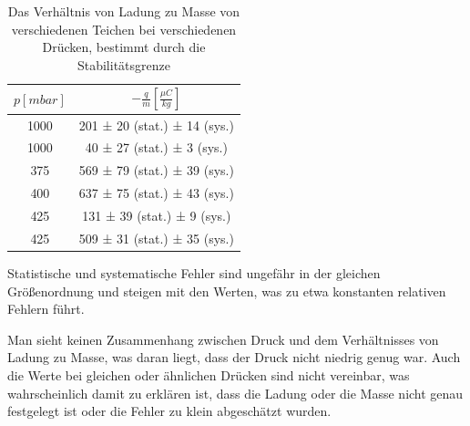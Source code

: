 \documentclass[a4paper,12pt]{article}
\begin{document}
\begin{table}[h]
	\centering
	\begin{tabular}{ c| c }
		$p [\unit{mbar}]$ & $-\frac{q}{m}[\frac{\mu C}{kg}]$ \\
		\hline
		1000 & 201 ± 20 (stat.) ± 14 (sys.)\\
		1000 & 40 ± 27 (stat.) ± 3 (sys.)\\
		375 & 569 ± 79 (stat.) ± 39 (sys.)\\
		400 & 637 ± 75 (stat.) ± 43 (sys.)\\
		425 & 131 ± 39 (stat.) ± 9 (sys.)\\
		425 & 509 ± 31 (stat.) ± 35 (sys.)
	\end{tabular}
\caption{Das Verhältnis von Ladung zu Masse von verschiedenen Teichen bei verschiedenen Drücken, bestimmt durch die Stabilitätsgrenze}
\label{tab:stabil-result}
\end{table}
Statistische und systematische Fehler sind ungefähr in der gleichen Größenordnung und steigen mit den Werten, was zu etwa konstanten relativen Fehlern führt.

Man sieht keinen Zusammenhang zwischen Druck und dem Verhältnisses von Ladung zu Masse, was daran liegt, dass der Druck nicht niedrig genug war.
Auch die Werte bei gleichen oder ähnlichen Drücken sind nicht vereinbar, was wahrscheinlich damit zu erklären ist, dass die Ladung oder die Masse nicht genau festgelegt ist 
oder die Fehler zu klein abgeschätzt wurden.
\end{document}
